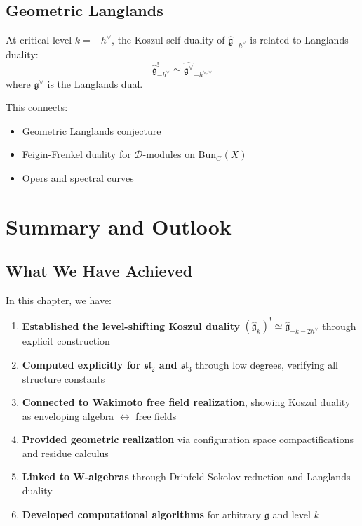 \subsection{Geometric Langlands}

\begin{principle}
At critical level $k = -h^\vee$, the Koszul self-duality of $\widehat{\mathfrak{g}}_{-h^\vee}$ is related to Langlands duality:
\begin{equation}
\widehat{\mathfrak{g}}_{-h^\vee}^! \simeq \widehat{\mathfrak{g}^\vee}_{-h^{\vee,\vee}}
\end{equation}
where $\mathfrak{g}^\vee$ is the Langlands dual.

This connects:
\begin{itemize}
\item Geometric Langlands conjecture
\item Feigin-Frenkel duality for $\mathcal{D}$-modules on $\mathrm{Bun}_G(X)$
\item Opers and spectral curves
\end{itemize}
\end{principle}

\section{Summary and Outlook}

\subsection{What We Have Achieved}

In this chapter, we have:

\begin{enumerate}
\item \textbf{Established the level-shifting Koszul duality} $(\widehat{\mathfrak{g}}_k)^! \simeq \widehat{\mathfrak{g}}_{-k-2h^\vee}$ through explicit construction

\item \textbf{Computed explicitly for $\mathfrak{sl}_2$ and $\mathfrak{sl}_3$} through low degrees, verifying all structure constants

\item \textbf{Connected to Wakimoto free field realization}, showing Koszul duality as enveloping algebra $\leftrightarrow$ free fields

\item \textbf{Provided geometric realization} via configuration space compactifications and residue calculus

\item \textbf{Linked to W-algebras} through Drinfeld-Sokolov reduction and Langlands duality

\item \textbf{Developed computational algorithms} for arbitrary $\mathfrak{g}$ and level $k$
\end{enumerate}

